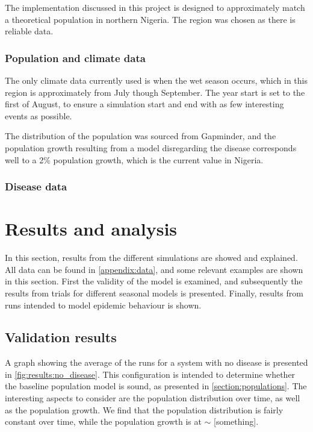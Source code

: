 \documentclass[10pt,a4paper]{article}
\begin{document}
The implementation discussed in this project is designed to approximately match a theoretical population in northern Nigeria. The region was chosen as there is reliable data.

\subsubsection{Population and climate data}

The only climate data currently used is when the wet season occurs, which in this region is approximately from July though September. The year start is set to the first of August, to ensure a simulation start and end with as few interesting events as possible.

The distribution of the population was sourced from Gapminder, and the population growth resulting from a model disregarding the disease corresponds well to a 2\% population growth, which is the current value in Nigeria.



\subsubsection{Disease data}


\section{Results and analysis}

In this section, results from the different simulations are showed and explained. All data can be found in \cref{appendix:data}, and some relevant examples are shown in this section. First the validity of the model is examined, and subsequently the results from trials for different seasonal models is presented. Finally, results from runs intended to model epidemic behaviour is shown.

\subsection{Validation results}

A graph showing the average of the runs for a system with no disease is presented in \cref{fig:results:no_disease}. This configuration is intended to determine whether the baseline population model is sound, as presented in \cref{section:populations}. The interesting aspects to consider are the population distribution over time, as well as the population growth. We find that the population distribution is fairly constant over time, while the population growth is at $\sim$ [something].
\end{document}

